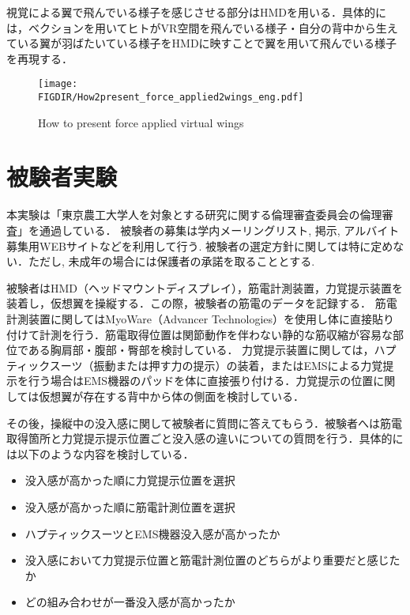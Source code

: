 \begin{small}
    視覚による翼で飛んでいる様子を感じさせる部分はHMDを用いる．具体的には，ベクションを用いてヒトがVR空間を飛んでいる様子・自分の背中から生えている翼が羽ばたいている様子をHMDに映すことで翼を用いて飛んでいる様子を再現する．

    \begin{figure}[b]
      \begin{center}
        \texttt{[image: \\FIGDIR/How2present\_force\_applied2wings\_eng.pdf]}%
        \caption{How to present force applied virtual wings}
      \end{center}
    \end{figure}



\section{被験者実験}
    本実験は「東京農工大学人を対象とする研究に関する倫理審査委員会の倫理審査」を通過している．
    被験者の募集は学内メーリングリスト, 掲示, アルバイト募集用WEBサイトなどを利用して行う. 被験者の選定方針に関しては特に定めない．ただし, 未成年の場合には保護者の承諾を取ることとする. 

    被験者はHMD（ヘッドマウントディスプレイ），筋電計測装置，力覚提示装置を装着し，仮想翼を操縦する．この際，被験者の筋電のデータを記録する．
    筋電計測装置に関してはMyoWare（Advancer Technologies）を使用し体に直接貼り付けて計測を行う．筋電取得位置は関節動作を伴わない静的な筋収縮が容易な部位である胸肩部・腹部・臀部を検討している．
    力覚提示装置に関しては，ハプティックスーツ（振動または押す力の提示）の装着，またはEMSによる力覚提示を行う場合はEMS機器のパッドを体に直接張り付ける．力覚提示の位置に関しては仮想翼が存在する背中から体の側面を検討している．
    
    その後，操縦中の没入感に関して被験者に質問に答えてもらう．被験者へは筋電取得箇所と力覚提示提示位置ごと没入感の違いについての質問を行う．具体的には以下のような内容を検討している．
    \begin{itemize}
      \item 没入感が高かった順に力覚提示位置を選択
      \item 没入感が高かった順に筋電計測位置を選択 %
      \item ハプティックスーツとEMS機器没入感が高かったか
      \item 没入感において力覚提示位置と筋電計測位置のどちらがより重要だと感じたか
      \item どの組み合わせが一番没入感が高かったか
    \end{itemize}


\end{small}
